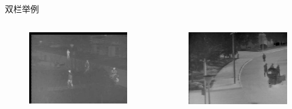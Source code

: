 \documentclass[aspectratio=169]{ahu-slide}
\newlength{\pheight}
\begin{document}
\begin{frame}{双栏举例}
\begin{columns}
        \begin{figure}
            \centering
            \includegraphics[height=0.7\pheight]{paper_figs/TIR_1.jpg}
        \end{figure}
        \vskip -0.5cm
        \begin{figure}
            \centering
            \includegraphics[height=0.7\pheight]{paper_figs/TIR_2.jpg}
        \end{figure}
    \end{columns}

\end{frame}


\end{document}
